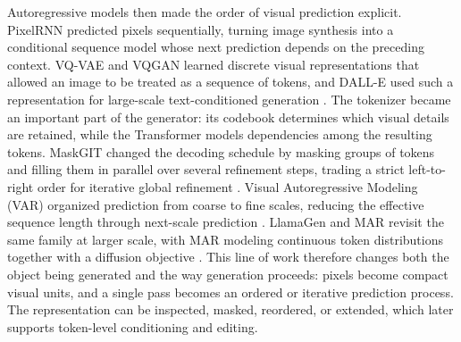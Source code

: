 Autoregressive models then made the order of visual prediction explicit. PixelRNN predicted pixels sequentially, turning image synthesis into a conditional sequence model whose next prediction depends on the preceding context. VQ-VAE and VQGAN learned discrete visual representations that allowed an image to be treated as a sequence of tokens, and DALL-E used such a representation for large-scale text-conditioned generation \cite{oord2016pixelrnn,oord2017vqvae,esser2021vqgan,ramesh2021dalle}. The tokenizer became an important part of the generator: its codebook determines which visual details are retained, while the Transformer models dependencies among the resulting tokens. MaskGIT changed the decoding schedule by masking groups of tokens and filling them in parallel over several refinement steps, trading a strict left-to-right order for iterative global refinement \cite{chang2022maskgit}. Visual Autoregressive Modeling (VAR) organized prediction from coarse to fine scales, reducing the effective sequence length through next-scale prediction \cite{tian2024var}. LlamaGen and MAR revisit the same family at larger scale, with MAR modeling continuous token distributions together with a diffusion objective \cite{llamagen2024,mar2024}. This line of work therefore changes both the object being generated and the way generation proceeds: pixels become compact visual units, and a single pass becomes an ordered or iterative prediction process. The representation can be inspected, masked, reordered, or extended, which later supports token-level conditioning and editing.


